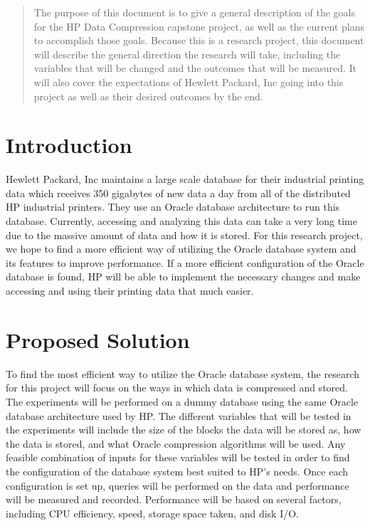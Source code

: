 \documentclass[10pt]{article}
\begin{document}
\maketitle

\begin{abstract}
The purpose of this document is to give a general description of the goals for the HP Data Compression capstone project, as well as the current plans to accomplish those goals.
Because this is a research project, this document will describe the general direction the research will take, including the variables that will be changed and the outcomes that will be measured.
It will also cover the expectations of Hewlett Packard, Inc going into this project as well as their desired outcomes by the end.   
\end{abstract}

\section{Introduction}
Hewlett Packard, Inc maintains a large scale database for their industrial printing data which receives 350 gigabytes of new data a day from all of the distributed HP industrial printers.
They use an Oracle database architecture to run this database. 
Currently, accessing and analyzing this data can take a very long time due to the massive amount of data and how it is stored. 
For this research project, we hope to find a more efficient way of utilizing the Oracle database system and its features to improve performance.
If a more efficient configuration of the Oracle database is found, HP will be able to implement the necessary changes and make accessing and using their printing data that much easier. 

\section{Proposed Solution}
To find the most efficient way to utilize the Oracle database system, the research for this project will focus on the ways in which data is compressed and stored.
The experiments will be performed on a dummy database using the same Oracle database architecture used by HP. 
The different variables that will be tested in the experiments will include the size of the blocks the data will be stored as, how the data is stored, and what Oracle compression algorithms will be used.
Any feasible combination of inputs for these variables will be tested in order to find the configuration of the database system best suited to HP's needs.
Once each configuration is set up, queries will be performed on the data and performance will be measured and recorded.
Performance will be based on several factors, including CPU efficiency, speed, storage space taken, and disk I/O.
\end{document}
